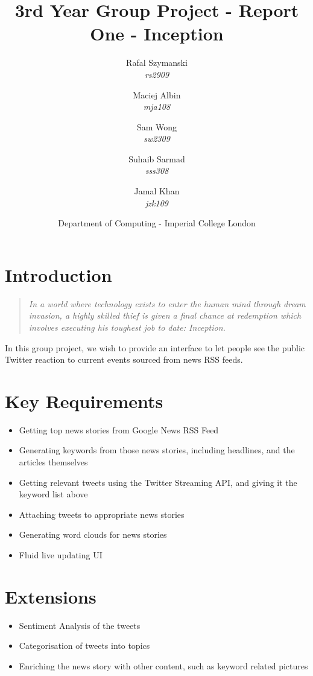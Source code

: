 \documentclass[a4paper,11pt]{article}
\title{3rd Year Group Project - Report One - Inception}
\author{
    \small{Rafal Szymanski}\\
		\small{\emph{rs2909}}
  	\and
    \small{Maciej Albin}\\
		\small{\emph{mja108}}
    \and
    \small{Sam Wong}\\
		\small{\emph{sw2309}}
    \and
    \small{Suhaib Sarmad}\\
		\small{\emph{sss308}}
		\and
		\small{Jamal Khan}\\
		\small{\emph{jzk109}}
		\and
		Department of Computing - Imperial College London
}
\begin{document}
 
	\maketitle
	
	\section{Introduction}
	
	\begin{quote}
\emph{		In a world where technology exists to enter the human mind through dream invasion, a highly skilled thief is given a final chance at redemption which involves executing his toughest job to date: Inception.}	\end{quote}

	In this group project, we wish to provide an interface to let people see the public Twitter reaction to current events sourced from news RSS feeds.

	
	\section{Key Requirements}
		
		\begin{itemize}
			\item Getting top news stories from Google News RSS Feed
			\item Generating keywords from those news stories, including headlines, and the articles themselves
			\item Getting relevant tweets using the Twitter Streaming API, and giving it the keyword list above
			\item Attaching tweets to appropriate news stories
			\item Generating word clouds for news stories
			\item Fluid live updating UI
		\end{itemize}
		
	\section{Extensions}
	
		\begin{itemize}
			\item Sentiment Analysis of the tweets
			\item Categorisation of tweets into topics
			\item Enriching the news story with other content, such as keyword related pictures
		\end{itemize}
	
\end{document}
